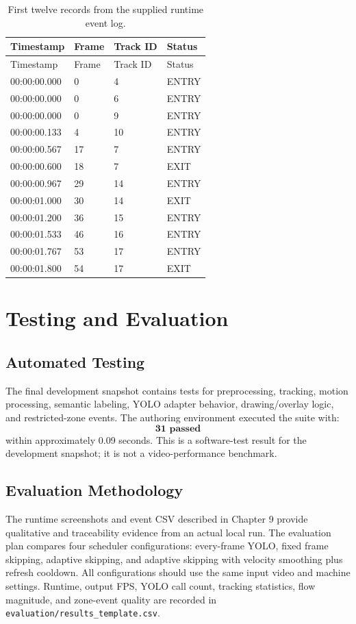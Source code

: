 \documentclass[12pt,a4paper]{report}
\newcommand{\code}[1]{\texttt{#1}}
\begin{document}
\begin{longtable}{llll}
\caption{First twelve records from the supplied runtime event log.}\label{tab:event_sample}\\
\toprule
Timestamp & Frame & Track ID & Status\\
\midrule
\endfirsthead
\toprule
Timestamp & Frame & Track ID & Status\\
\midrule
\endhead
00:00:00.000 & 0 & 4 & ENTRY\\
00:00:00.000 & 0 & 6 & ENTRY\\
00:00:00.000 & 0 & 9 & ENTRY\\
00:00:00.133 & 4 & 10 & ENTRY\\
00:00:00.567 & 17 & 7 & ENTRY\\
00:00:00.600 & 18 & 7 & EXIT\\
00:00:00.967 & 29 & 14 & ENTRY\\
00:00:01.000 & 30 & 14 & EXIT\\
00:00:01.200 & 36 & 15 & ENTRY\\
00:00:01.533 & 46 & 16 & ENTRY\\
00:00:01.767 & 53 & 17 & ENTRY\\
00:00:01.800 & 54 & 17 & EXIT\\
\bottomrule
\end{longtable}

\chapter{Testing and Evaluation}
\section{Automated Testing}
The final development snapshot contains tests for preprocessing, tracking, motion processing, semantic labeling, YOLO adapter behavior, drawing/overlay logic, and restricted-zone events. The authoring environment executed the suite with:
\[
\textbf{31 passed}
\]
within approximately 0.09 seconds. This is a software-test result for the development snapshot; it is not a video-performance benchmark.

\section{Evaluation Methodology}
The runtime screenshots and event CSV described in Chapter 9 provide qualitative and traceability evidence from an actual local run. The evaluation plan compares four scheduler configurations: every-frame YOLO, fixed frame skipping, adaptive skipping, and adaptive skipping with velocity smoothing plus refresh cooldown. All configurations should use the same input video and machine settings. Runtime, output FPS, YOLO call count, tracking statistics, flow magnitude, and zone-event quality are recorded in \code{evaluation/results\_template.csv}.
\end{document}

